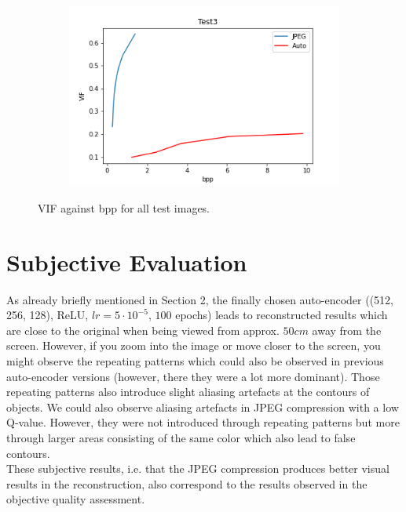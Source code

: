 \documentclass{article}
\begin{document}
\begin{figure}
\begin{subfigure}[b]{0.7 \textwidth}
    \includegraphics[width=\textwidth]{Images/Plots/test3_VIF.png}
    \end{subfigure}
    \caption{VIF against bpp for all test images.}
    \label{fig:objective_VIF}
\end{figure}




\section{Subjective Evaluation}

As already briefly mentioned in Section 2, the finally chosen auto-encoder ((512, 256, 128), ReLU, $lr = 5 \cdot 10^{-5}$, $100$ epochs) leads to reconstructed results which are close to the original when being viewed from approx. $50cm$ away from the screen. However, if you zoom into the image or move closer to the screen, you might observe the repeating patterns which could also be observed in previous auto-encoder versions (however, there they were a lot more dominant). Those repeating patterns also introduce slight aliasing artefacts at the contours of objects. We could also observe aliasing artefacts in JPEG compression with a low Q-value. However, they were not introduced through repeating patterns but more through larger areas consisting of the same color which also lead to false contours.\\

These subjective results, i.e. that the JPEG compression produces better visual results in the reconstruction, also correspond to the results observed in the objective quality assessment. \\
\end{document}

